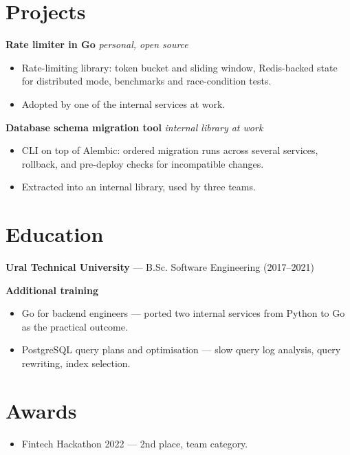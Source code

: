 \documentclass[a4paper,10pt]{article}
\begin{document}
\section*{Projects}

\textbf{Rate limiter in Go} \hfill \textit{personal, open source}
\begin{itemize}
    \item Rate-limiting library: token bucket and sliding window, Redis-backed state
          for distributed mode, benchmarks and race-condition tests.
    \item Adopted by one of the internal services at work.
\end{itemize}

\textbf{Database schema migration tool} \hfill \textit{internal library at work}
\begin{itemize}
    \item CLI on top of Alembic: ordered migration runs across several services,
          rollback, and pre-deploy checks for incompatible changes.
    \item Extracted into an internal library, used by three teams.
\end{itemize}

\section*{Education}

\textbf{Ural Technical University} --- B.Sc. Software Engineering (2017--2021)

\textbf{Additional training}
\begin{itemize}
    \item Go for backend engineers --- ported two internal services from Python to Go
          as the practical outcome.
    \item PostgreSQL query plans and optimisation --- slow query log analysis, query
          rewriting, index selection.
\end{itemize}

\section*{Awards}

\begin{itemize}
    \item Fintech Hackathon 2022 --- 2nd place, team category.
\end{itemize}
\end{document}
